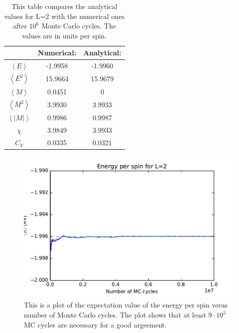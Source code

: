

\begin{table}\caption{This table compares the analytical values for L=2 with the numerical ones after $10^6$ Monte Carlo cycles. The values are in units per spin.}\label{tab:compare_values}
\begin{tabular}{ccc}
& Numerical: & Analytical:\\ \hline
$\left<E\right>$ &   -1.9958 & -1.9960\\
$\left<E^2\right>$ &   15.9664 & 15.9679\\
$\left<M\right>$ &    0.0451 & 0\\
$\left<M^2\right>$ &    3.9930 & 3.9933\\
$\left<|M|\right>$ &    0.9986 & 0.9987\\
$\chi$ &   3.9849 & 3.9933\\
  $C_V$& 0.0335 & 0.0321\\
\end{tabular}
\end{table}

\begin{figure}[H]
\includegraphics[width=\linewidth]{../results/4b/L_2_energy}\caption{This is a plot of the expectation value of the energy per spin verus number of Monte Carlo cycles. The plot shows that at least $ 9 \cdot 10^{5} $ MC cycles are necessary for a good argeement.}\label{fig:L_2_energy}
\end{figure}

